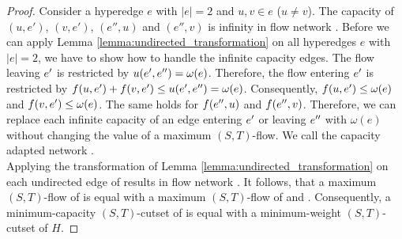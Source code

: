 \begin{proof}
Consider a hyperedge $e$ with $|e| = 2$ and $u,v \in e$ ($u \neq v$). The capacity of
$(u,e')$, $(v,e')$, $(e'',u)$ and $(e'',v)$ is infinity in flow network . 
Before we can apply Lemma \ref{lemma:undirected_transformation} on all hyperedges 
$e$ with $|e| = 2$, we have to show how to handle the infinite capacity edges.
The flow leaving $e'$ is restricted by $u(e',e'') = \omega(e)$. Therefore, the flow entering
$e'$ is restricted by $f(u,e') + f(v,e') \le u(e',e'') = \omega(e)$.
Consequently, $f(u,e') \le \omega(e)$ and $f(v,e') \le \omega(e)$.
The same holds for $f(e'',u)$ and $f(e'',v)$. Therefore, we can replace each infinite 
capacity of an edge entering $e'$ or leaving $e''$ with $\omega(e)$ without changing the value
of a maximum $(S,T)$-flow. We call the capacity adapted network .\\
Applying the transformation of Lemma \ref{lemma:undirected_transformation} on each undirected
edge of  results in flow network . It follows, that a maximum $(S,T)$-flow of  is equal
with a maximum $(S,T)$-flow of  and . Consequently, a minimum-capacity
$(S,T)$-cutset of  is equal with a minimum-weight $(S,T)$-cutset of $H$.


\end{proof}
